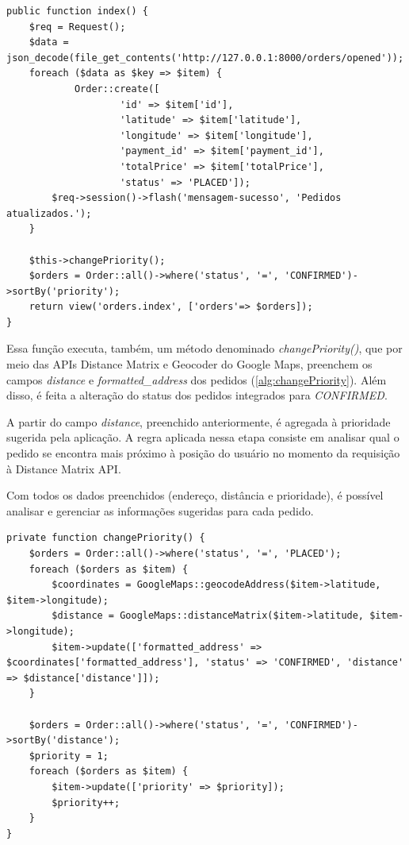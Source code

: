 \begin{lstlisting}[caption={Delivery Routes - Função integradora de pedidos}, style=htmlcssjs, label=alg:orderIndex]
public function index() {
    $req = Request();
    $data = json_decode(file_get_contents('http://127.0.0.1:8000/orders/opened'));
    foreach ($data as $key => $item) {
            Order::create([
                    'id' => $item['id'],
                    'latitude' => $item['latitude'],
                    'longitude' => $item['longitude'],
                    'payment_id' => $item['payment_id'],
                    'totalPrice' => $item['totalPrice'],
                    'status' => 'PLACED']);
        $req->session()->flash('mensagem-sucesso', 'Pedidos atualizados.');
    }

    $this->changePriority();
    $orders = Order::all()->where('status', '=', 'CONFIRMED')->sortBy('priority');
    return view('orders.index', ['orders'=> $orders]);
}
\end{lstlisting}

Essa função executa, também, um método denominado \textit{changePriority()}, que por meio das APIs Distance Matrix e Geocoder do Google Maps, preenchem os campos \textit{distance} e \textit{formatted\_address} dos pedidos (\autoref{alg:changePriority}). Além disso, é feita a alteração do status dos pedidos integrados para \textit{CONFIRMED}.

A partir do campo \textit{distance}, preenchido anteriormente, é agregada à prioridade sugerida pela aplicação. A regra aplicada nessa etapa consiste em analisar qual o pedido se encontra mais próximo à posição do usuário no momento da requisição à Distance Matrix API.

Com todos os dados preenchidos (endereço, distância e prioridade), é possível analisar e gerenciar as informações sugeridas para cada pedido.

\newpage
\begin{lstlisting}[caption={Delivery Routes - Função de troca de prioridade dos pedidos}, style=htmlcssjs, label=alg:changePriority]
 private function changePriority() {
    $orders = Order::all()->where('status', '=', 'PLACED');
    foreach ($orders as $item) {
        $coordinates = GoogleMaps::geocodeAddress($item->latitude, $item->longitude);
        $distance = GoogleMaps::distanceMatrix($item->latitude, $item->longitude);
        $item->update(['formatted_address' => $coordinates['formatted_address'], 'status' => 'CONFIRMED', 'distance' => $distance['distance']]);
    }

    $orders = Order::all()->where('status', '=', 'CONFIRMED')->sortBy('distance');
    $priority = 1;
    foreach ($orders as $item) {
        $item->update(['priority' => $priority]);
        $priority++;
    }
}
\end{lstlisting}